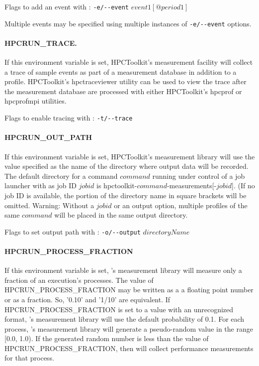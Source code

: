 \parg
Flags to add an event with \hpcrun: \verb|-e/--event| $event1[@period1]$ 

\parg
Multiple events may be specified using multiple instances of \verb|-e/--event| options.

\paragraph{HPCRUN\_TRACE.}

If this environment variable is set, HPCToolkit's measurement
facility will collect a trace of sample events as part of a measurement
database in addition to a profile. HPCToolkit's hpctraceviewer
utility can be used to view the trace after the measurement database
are processed with either HPCToolkit's hpcprof or hpcprofmpi
utilities.

\parg
Flags to enable tracing with \hpcrun: \verb|-t/--trace|

\paragraph{HPCRUN\_OUT\_PATH}

If this environment variable is set, HPCToolkit's measurement library
will use the value specified as the name of the directory where
output data will be recorded. The default directory for a command
$command$ running under control of a job launcher with as job ID
$jobid$ is hpctoolkit-$command$-measurements[-$jobid$]. (If no
job ID is available, the portion of the directory name in square
brackets will be omitted. Warning: Without a $jobid$ or an output
option, multiple profiles of the same $command$ will be placed
in the same output directory.

\parg
Flags to set output path with \hpcrun: \verb|-o/--output| $directoryName$

\paragraph{HPCRUN\_PROCESS\_FRACTION}

If this environment variable is set, \HPCToolkit's measurement
library will measure only a fraction of an execution’s processes.
The value of HPCRUN\_PROCESS\_FRACTION may be written as a a floating
point number or as a fraction.  So, '0.10' and '1/10' are equivalent.
If HPCRUN\_PROCESS\_FRACTION is set to a value with an unrecognized
format, \HPCToolkit's measurement library will use the default
probability of 0.1. For each process, \HPCToolkit's measurement
library will generate a pseudo-random value in the range [0.0, 1.0).
If the generated random number is less than the value of
HPCRUN\_PROCESS\_FRACTION, then \HPCToolkit{} will collect performance
measurements for that process.

